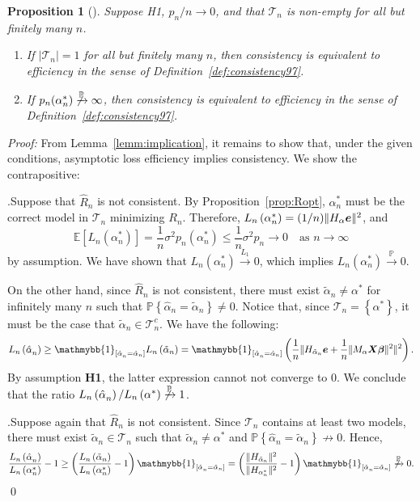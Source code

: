 \documentclass[11pt, letter paper]{article}
\newcommand{\1}{\mathmybb{1}}
\newtheorem{proposition}{Proposition}[section]
\newcommand{\0}{\emptyset}
\newcommand{\prob}{\mathbb{P}}
\newcommand{\Ep}[1]{\mathbb{E}\left[ #1 \right]}
\newcommand{\paren}[1]{\left(#1 \right)}
\newcommand{\sqbr}[1]{\left[#1 \right]}
\newcommand{\set}[1]{\left\{ #1 \right\}}
\newcommand{\norm}[1]{|\hspace{-1pt}|#1 |\hspace{-1pt}|}
\newcommand{\normsq}[1]{\norm{#1}^{2}}
\newcommand{\ind}[1]{\mathmybb{1}_{\sqbr{#1}}}
\newcommand{\Tcal}{\mathcal{T}_{n}}
\newcommand{\X}{\boldsymbol{X}}
\newcommand{\e}{\boldsymbol{e}}
\newcommand{\bbeta}{\boldsymbol{\beta}}
\newcommand{\Loss}[1]{L_{n}\paren{#1}}
\newcommand{\alphahat}[1]{\hat{\alpha}^{#1}}
\newcommand{\alphatilde}{\tilde{\alpha}}
\begin{document}
\begin{proposition}[\cite{shao_1997}]\label{prop:equiv}
    Suppose H1, \(p_{n}/n\to 0\), and that \(\Tcal\) is non-empty for all but finitely many \(n\).
    \begin{enumerate}
        \item If \(|\Tcal|=1\) for all but finitely many \(n\), then consistency is equivalent to efficiency in the sense of Definition~\ref{def:consistency97}.
        \item If \(p_{n}(\alpha^{*}_{n})\not\xrightarrow{\prob}\infty\), then consistency is equivalent to efficiency in the sense of Definition~\ref{def:consistency97}.
    \end{enumerate}
\end{proposition}
\begin{myproofbox}
    \textit{Proof: }
    From Lemma~\ref{lemm:implication}, it remains to show that, under the given conditions, asymptotic loss efficiency implies consistency. We show the contrapositive:

    .\quad Suppose that \(\hat{R}_{n}\) is not consistent. By Proposition~\ref{prop:Ropt}, \(\alpha^{*}_{n}\) must be the correct model in \(\Tcal\) minimizing \(R_{n}\). Therefore, \(\Loss{\alpha^{*}_{n}} = (1/n)\normsq{H_{\alpha}\e}\), and
    \[\Ep{\Loss{\alpha^{*}_{n}}} = \frac{1}{n}\sigma^{2}p_{n}(\alpha^{*}_{n})\leq \frac{1}{n}\sigma^{2}p_{n}\to 0 \quad\text{as }n\to\infty\]
    by assumption. We have shown that \(\Loss{\alpha^{*}_{n}}\xrightarrow{L_{1}} 0\), which implies \(\Loss{\alpha^{*}_{n}}\xrightarrow{\prob} 0\).

    On the other hand, since \(\hat{R}_{n}\) is not consistent, there must exist \(\alphatilde_{n}\neq\alpha^{*}\) for infinitely many \(n\) such that \(\prob\set{\alphahat{}_{n} = \alphatilde_{n}} \neq 0\). Notice that, since \(\Tcal=\set{\alpha^{*}}\), it must be the case that \(\alphatilde_{n}\in\Tcal^{c}\). We have the following:
    \[\Loss{\alphahat{}_{n}}\geq \ind{\alphahat{}_{n} = \alphatilde_{n}}\Loss{\alphatilde_{n}} = \ind{\alphahat{}_{n} = \alphatilde_{n}}\paren{\frac{1}{n}\normsq{H_{\alphatilde_{n}}\e + \frac{1}{n}\normsq{M_{\alpha}\X\bbeta}}}.\]
    By assumption \textbf{H1}, the latter expression cannot not converge to 0. We conclude that the ratio \(\Loss{\alphahat{}_{n}}/\Loss{\alpha^{*}}\not\xrightarrow{\prob} 1\).

    .\quad Suppose again that \(\hat{R}_{n}\) is not consistent. Since \(\Tcal\) contains at least two models, there must exist \(\alphatilde_{n}\in\Tcal\) such that \(\alphatilde_{n}\neq \alpha^{*}\) and \(\prob\set{\alphahat{}_{n} = \alphatilde_{n}}\not\to 0\). Hence,
    \[\frac{\Loss{\alphahat{}_{n}}}{\Loss{\alpha^{*}_{n}}} - 1 \geq \paren{\frac{\Loss{\alphatilde{}_{n}}}{\Loss{\alpha^{*}_{n}}} - 1}\ind{\alphahat{}_{n} = \alphatilde_{n}} = \paren{\frac{\normsq{H_{\alphatilde_{n}}}}{\normsq{H_{\alpha^{*}_{n}}}} - 1}\ind{\alphahat{}_{n} = \alphatilde_{n}}\not\xrightarrow{\prob}0.\]\qed{}
\end{myproofbox}
\end{document}
